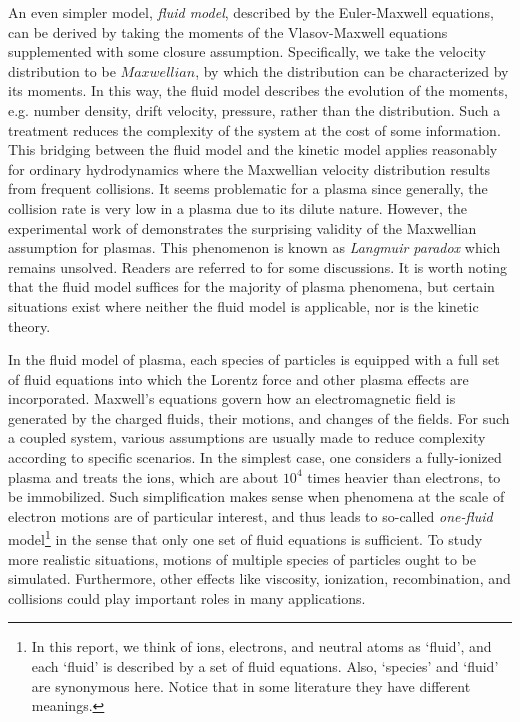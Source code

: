 \documentclass{report}
\begin{document}
An even simpler model, \emph{fluid model}, described by the Euler-Maxwell equations, can be derived by taking the moments of the Vlasov-Maxwell equations supplemented with some closure assumption. Specifically, we take the velocity distribution to be $Maxwellian$, by which the distribution can be characterized by its moments. In this way, the fluid model describes the evolution of the moments, e.g. number density, drift velocity, pressure, rather than the distribution. Such a treatment reduces the complexity of the system at the cost of some information. This bridging between the fluid model and the kinetic model applies reasonably for ordinary hydrodynamics where the Maxwellian velocity distribution results from frequent collisions. It seems problematic for a plasma since generally, the collision rate is very low in a plasma due to its dilute nature. However, the experimental work of \cite{langmuir1925} demonstrates the surprising validity of the Maxwellian assumption for plasmas. This phenomenon is known as \emph{Langmuir paradox} which remains unsolved. Readers are referred to \cite[][p. 63]{chen2016} for some discussions. It is worth noting that the fluid model suffices for the majority of plasma phenomena, but certain situations exist where neither the fluid model is applicable, nor is the kinetic theory.

In the fluid model of plasma, each species of particles is equipped with a full set of fluid equations into which the Lorentz force and other plasma effects are incorporated. Maxwell's equations govern how an electromagnetic field is generated by the charged fluids, their motions, and changes of the fields. For such a coupled system, various assumptions are usually made to reduce complexity according to specific scenarios. In the simplest case, one considers a fully-ionized plasma and treats the ions, which are about $10^4$ times heavier than electrons, to be immobilized. Such simplification makes sense when phenomena at the scale of electron motions are of particular interest, and thus leads to so-called \emph{one-fluid} model\footnote{In this report, we think of ions, electrons, and neutral atoms as `fluid', and each `fluid' is described by a set of fluid equations. Also, `species' and `fluid' are synonymous here. Notice that in some literature they have different meanings.} in the sense that only one set of fluid equations is sufficient. To study more realistic situations, motions of multiple species of particles ought to be simulated. Furthermore, other effects like viscosity, ionization, recombination, and collisions could play important roles in many applications.         
\end{document}
